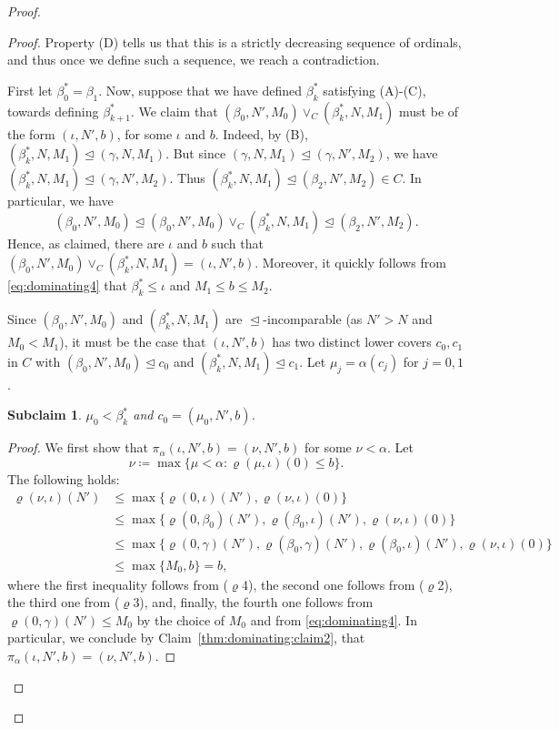 \documentclass[]{amsart}
\newtheorem*{subclaim*}{Subclaim}
\theoremstyle{definition}
\theoremstyle{remark}
\begin{document}
\begin{proof}
\begin{proof}
Property (D) tells us that this is a strictly decreasing sequence of ordinals, and thus once we define such a sequence, we reach a contradiction.

First let $\beta^*_0 = \beta_1$. Now, suppose that we have defined $\beta^*_k$ satisfying (A)-(C), towards defining $\beta^*_{k+1}$. We claim that $(\beta_0, N', M_0) \vee_C (\beta^*_{k}, N, M_1)$ must be of the form $(\iota, N', b)$, for some $\iota$ and $b$. Indeed, by (B), $(\beta^*_{k}, N, M_1) \trianglelefteq (\gamma, N, M_1)$. But since $(\gamma, N, M_1) \trianglelefteq (\gamma, N', M_2)$, we have $(\beta^*_{k}, N, M_1) \trianglelefteq (\gamma, N', M_2)$. Thus $(\beta^*_{k}, N, M_1) \trianglelefteq (\beta_2, N', M_2) \in C$. In particular, we have
\begin{equation}\label{eq:dominating4}
(\beta_0, N', M_0) \trianglelefteq (\beta_0, N', M_0) \vee_C (\beta^*_{k}, N, M_1) \trianglelefteq (\beta_2, N', M_2).
\end{equation}
Hence, as claimed, there are $\iota$ and $b$ such that $(\beta_0, N', M_0) \vee_C (\beta^*_{k}, N, M_1) = (\iota, N', b)$. Moreover, it quickly follows from \eqref{eq:dominating4} that  $\beta^*_k \le \iota$ and $M_1 \le b \le M_2$.

Since $(\beta_0, N', M_0)$ and $(\beta^*_k, N, M_1)$ are $\trianglelefteq$-incomparable (as $N' > N$ and $M_0 < M_1$), it must be the case that $(\iota, N', b)$ has two distinct lower covers $c_0, c_1$ in $C$  with $(\beta_0, N', M_0) \trianglelefteq c_0$ and $(\beta^*_k, N, M_1) \trianglelefteq c_1$. Let $\mu_j = \alpha(c_j)$ for $j = 0,1$.

\begin{subclaim*}
$\mu_0 < \beta^*_k$ and $c_0 = (\mu_0, N', b)$.
\end{subclaim*}
\begin{proof}
We first show that $\pi_\alpha (\iota, N', b) = (\nu, N', b)$ for some $\nu < \alpha$.  Let  \[
\nu \coloneqq \max \{\mu < \alpha : \varrho(\mu, \iota)(0) \le b\}.
\]
The following holds:
\begin{align*}
\varrho(\nu, \iota)(N') &\le \max\{\varrho(0, \iota)(N'), \varrho(\nu, \iota)(0)\}
\\&\le \max\{\varrho(0, \beta_0)(N'), \varrho(\beta_0, \iota)(N'), \varrho(\nu, \iota)(0)\}
\\&\le \max\{\varrho(0, \gamma)(N'), \varrho(\beta_0, \gamma)(N'), \varrho(\beta_0, \iota)(N'), \varrho(\nu, \iota)(0)\}\\&\le \max\{M_0, b\} = b,
\end{align*}
where the first inequality follows from ($\varrho$4), the second one follows from ($\varrho$2), the third one from ($\varrho$3), and, finally, the fourth one follows from $\varrho(0, \gamma)(N') \le M_0$ by the choice of $M_0$ and from \eqref{eq:dominating4}. In particular, we conclude by Claim~\ref{thm:dominating:claim2}, that $\pi_\alpha (\iota, N', b) = (\nu, N', b)$.


\end{proof}
\end{proof}
\end{proof}
\end{document}
